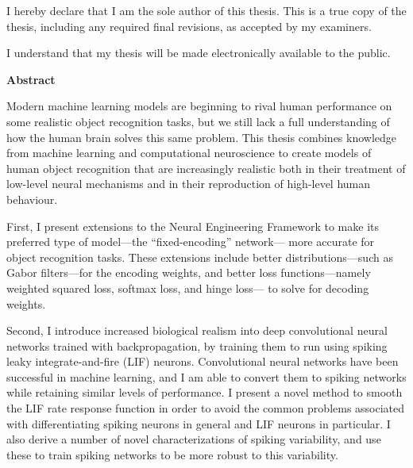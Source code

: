 \cleardoublepage


\noindent
I hereby declare that I am the sole author of this thesis.
This is a true copy of the thesis, including any required final revisions,
as accepted by my examiners.

  \bigskip

\noindent
I understand that my thesis will be made electronically available to the public.

\cleardoublepage


\begin{center}\textbf{Abstract}\end{center}

\noindent
Modern machine learning models are beginning to rival human performance
on some realistic object recognition tasks,
but we still lack a full understanding
of how the human brain solves this same problem.
This thesis combines knowledge from machine learning and computational neuroscience
to create models of human object recognition
that are increasingly realistic
both in their treatment of low-level neural mechanisms
and in their reproduction of high-level human behaviour.

First, I present extensions to the Neural Engineering Framework
to make its preferred type of model---the ``fixed-encoding'' network---%
more accurate for object recognition tasks.
These extensions include better distributions---such as Gabor filters---for the encoding weights,
and better loss functions---namely weighted squared loss, softmax loss, and hinge loss---%
to solve for decoding weights.

Second, I introduce increased biological realism into
deep convolutional neural networks trained with backpropagation,
by training them to run using spiking leaky integrate-and-fire (LIF) neurons.
Convolutional neural networks have been successful in machine learning,
and I am able to convert them to spiking networks
while retaining similar levels of performance.
I present a novel method to smooth the LIF rate response function
in order to avoid the common problems associated with differentiating
spiking neurons in general and LIF neurons in particular.
I also derive a number of novel characterizations of spiking variability,
and use these to train spiking networks to be more robust to this variability.


